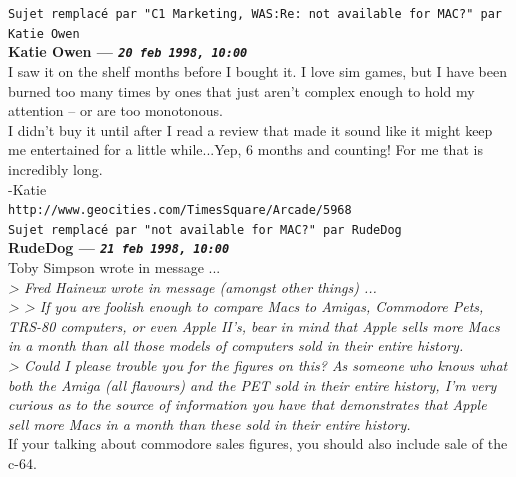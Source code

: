 \documentclass[11pt,twoside,a4paper]{article}
\begin{document}
\begin{multicols*}{2}
 
		
	
		
\texttt{Sujet remplac{\'e} par "C1 Marketing, WAS:Re: not available for MAC?" par Katie Owen}~\\
		
	
		
\textbf{Katie Owen --- \emph{\texttt{20 feb 1998, 10:00}}}~\\

I saw it on the shelf months before I bought it.  I love sim games, but I have been burned too many times by ones that just aren't complex enough to hold my attention -- or are too monotonous.~\\

I didn't buy it until after I read a review that made it sound like it might keep me entertained for a little while...Yep, 6 months and counting!  For me that is incredibly long.~\\

-Katie~\\
\texttt{http://www.geocities.com/TimesSquare/Arcade/5968}~\\

 
		
	
		
\texttt{Sujet remplac{\'e} par "not available for MAC?" par RudeDog}~\\
		
	
		
\textbf{RudeDog --- \emph{\texttt{21 feb 1998, 10:00}}}~\\

Toby Simpson wrote in message ...~\\
\emph{> Fred Haineux wrote in message (amongst other things) ...}~\\
\emph{> > If you are foolish enough to compare Macs to Amigas, Commodore Pets, TRS-80 computers, or even Apple II's, bear in mind that Apple sells more Macs in a month than all those models of computers sold in their entire history.}~\\
\emph{> Could I please trouble you for the figures on this? As someone who knows what both the Amiga (all flavours) and the PET sold in their entire history, I'm very curious as to the source of information you have that demonstrates that Apple sell more Macs in a month than these sold in their entire history.}~\\

If your talking about commodore sales figures, you should also include sale of the c-64.~\\


\end{multicols*}
\end{document}
